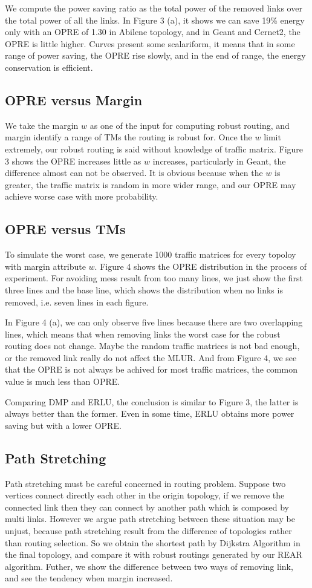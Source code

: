\documentclass[conference]{IEEEtran}
\begin{document}
We compute the power saving ratio as the total power of the removed links over the total power of all the links. 
In Figure 3 (a), it shows we can save 19\% energy only with an OPRE of 1.30 in Abilene topology, and in Geant and Cernet2, 
the OPRE is little higher. Curves present some scalariform, it means that in some range of power saving, the OPRE rise slowly,
and in the end of range, the energy conservation is efficient.


\subsection{OPRE versus Margin}
We take the margin $w$ as one of the input for computing robust routing, and margin identify a range of TMs the routing is 
robust for. Once the $w$ limit extremely, our robust routing is said without knowledge of traffic matrix. Figure 3 shows the 
OPRE increases little as $w$ increases, particularly in Geant, the difference almost can not be observed. It is obvious because
when the $w$ is greater, the traffic matrix is random in more wider range, and our OPRE may achieve worse case with more probability.


\subsection{OPRE versus TMs}
To simulate the worst case, we generate 1000 traffic matrices for every topoloy with margin attribute $w$. Figure 4 shows
the OPRE distribution in the process of experiment. For avoiding mess result from too many lines, we just show the first 
three lines and the base line, which shows the distribution when no links is removed, i.e. seven lines in each figure.


In Figure 4 (a), we can only observe five lines because there are two overlapping lines, which means that when removing 
links the worst case for the robust routing does not change. Maybe the random traffic matrices is not bad enough, or the 
removed link really do not affect the MLUR. And from Figure 4, we see that the OPRE is not always be achived for most
traffic matrices, the common value is much less than OPRE. 


Comparing DMP and ERLU, the conclusion is similar to Figure 3, the latter is always better than the former. Even in some 
time, ERLU obtains more power saving but with a lower OPRE.

\subsection{Path Stretching}
Path stretching must be careful concerned in routing problem. Suppose two vertices connect directly each other in the origin topology,
if we remove the connected link then they can connect by another path which is composed by multi links. However we argue path stretching
between these situation may be unjust, because path stretching result from the difference of topologies rather than routing selection.
So we obtain the shortest path by Dijkstra Algorithm in the final topology, and compare it with robust routings generated by 
our REAR algorithm. Futher, we show the difference between two ways of removing link, and see the tendency when margin increased.
\end{document}
